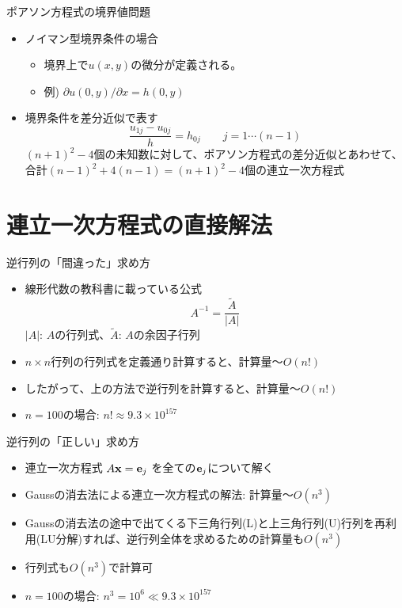 \documentclass[dvipdfmx]{beamer}
\begin{document}
\begin{frame}[t,fragile]{ポアソン方程式の境界値問題}
  \begin{itemize}
    \setlength{\itemsep}{1em}
  \item ノイマン型境界条件の場合
    \begin{itemize}
    \item 境界上で$u(x,y)$の微分が定義される。
    \item 例) $\partial u(0,y) / \partial x = h(0,y)$
    \end{itemize}
  \item 境界条件を差分近似で表す
    \[
    \frac{u_{1j} - u_{0j}}{h} = h_{0j} \qquad j=1 \cdots (n-1)
    \]
    $(n+1)^2-4$個の未知数に対して、ポアソン方程式の差分近似とあわせて、合計$(n-1)^2+4(n-1)=(n+1)^2-4$個の連立一次方程式
  \end{itemize}
\end{frame}

\section{連立一次方程式の直接解法}

\begin{frame}[t,fragile]{逆行列の「間違った」求め方}
  \begin{itemize}
    \setlength{\itemsep}{1em}
  \item 線形代数の教科書に載っている公式
    \[
    A^{-1} = \frac{\tilde{A}}{|A|}
    \]
    $|A|$: $A$の行列式、$\tilde{A}$: $A$の余因子行列
  \item $n \times n$行列の行列式を定義通り計算すると、計算量〜$O(n!)$
  \item したがって、上の方法で逆行列を計算すると、計算量〜$O(n!)$
  \item $n=100$の場合: $n! \approx 9.3 \times 10^{157}$
  \end{itemize}
\end{frame}

\begin{frame}[t,fragile]{逆行列の「正しい」求め方}
  \begin{itemize}
    \setlength{\itemsep}{1em}
  \item 連立一次方程式 $A {\bf x} = {\bf e}_j$ を全ての${\bf e}_j$について解く
  \item Gaussの消去法による連立一次方程式の解法: 計算量〜$O(n^3)$
  \item Gaussの消去法の途中で出てくる下三角行列(L)と上三角行列(U)行列を再利用(LU分解)すれば、逆行列全体を求めるための計算量も$O(n^3)$
  \item 行列式も$O(n^3)$で計算可
  \item $n=100$の場合: $n^3 = 10^6 \ll 9.3 \times 10^{157}$
  \end{itemize}
\end{frame}
\end{document}
